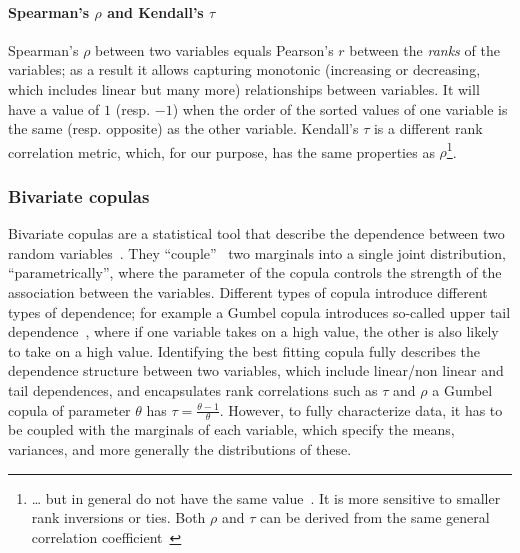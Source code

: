 \documentclass[manuscript,review,anonymous]{acmart}
\begin{document}
\paragraph{Spearman's $\rho$ and Kendall's $\tau$}
Spearman's $\rho$ between two variables equals Pearson's $r$ between the \textit{ranks} of the variables; as a result it allows capturing monotonic (increasing or decreasing, which includes linear but many more) relationships between variables. It will have a value of $1$ (resp. $-1$) when the order of the sorted values of one variable is the same (resp. opposite) as the other variable.
Kendall's $\tau$ is a different rank correlation metric, which, for our purpose, has the same properties as $\rho$\footnote{\dots{} but in general do not have the same value~\cite[Chapter 5]{nelsen2006}. It is more sensitive to smaller rank inversions or ties. Both $\rho$ and $\tau$ can be derived from the same general correlation coefficient~\cite{kendall1948}}.





\subsubsection{Bivariate copulas \label{subsub:copula}}
Bivariate copulas are a statistical tool that describe the dependence between two random variables~\cite{nelsen2006}.
They ``couple''~\cite[Chapter 1]{nelsen2006} two marginals into a single joint distribution, ``parametrically'', where the parameter of the copula controls the strength of the association between the variables.
Different types of copula introduce different types of dependence; for example a Gumbel copula introduces so-called upper tail dependence~\cite{nelsen2006}, where if one variable takes on a high value, the other is also likely to take on a high value.
Identifying the best fitting copula fully describes the dependence structure between two variables, which include linear/non linear and tail dependences, and encapsulates rank correlations such as $\tau$ and $\rho$ \eg a Gumbel copula of parameter $\theta$ has $\tau  = \frac{\theta -1}{\theta}$. However, to fully characterize data, it has to be coupled with the marginals of each variable, which specify the means, variances, and more generally the distributions of these.
\end{document}
